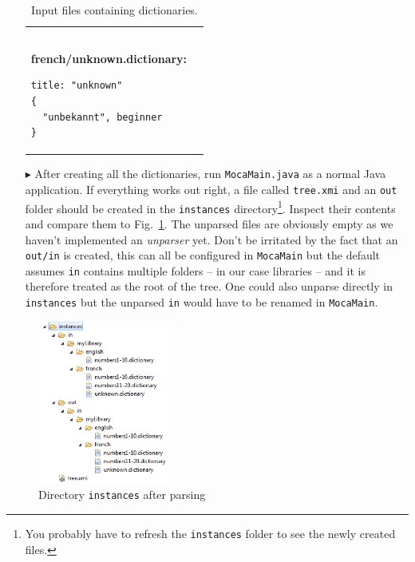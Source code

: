 \begin{enumerate}
\begin{table}
\begin{tabular}{p{6cm} p{6cm} }
\begin{verbatim}
\end{verbatim}
\textbf{french/unknown.dictionary:}
\begin{verbatim}
title: "unknown"
{
  "unbekannt", beginner
}
\end{verbatim}
  \\
\end{tabular}   
\caption{Input files containing dictionaries.}
\label{moca-inputdata}

\end{table}   

\item[$\blacktriangleright$] After creating all the dictionaries, run \texttt{MocaMain.java} as a normal Java application. 
If everything works out right, a file called \texttt{tree.xmi} and an \texttt{out} folder should be created in the \texttt{instances} directory\footnote{You probably have to refresh the \texttt{instances} folder to see the newly created files.}.  
Inspect their contents and compare them to Fig.~\ref{fig:moca-9-ParseResult1}. 
The unparsed files are obviously empty as we haven't implemented an \emph{unparser} yet.  
Don't be irritated by the fact that an \texttt{out/in} is created, this can all be configured in \texttt{MocaMain} but the default assumes \texttt{in} contains multiple folders -- in our case libraries -- and it is therefore treated as the root of the tree.  
One could also unparse directly in \texttt{instances} but the unparsed \texttt{in} would have to be renamed in \texttt{MocaMain}.
\end{enumerate}

\begin{figure}[!htbp]
\begin{center}
 \includegraphics[width=0.4\textwidth]{pics/moca/2TextToMocaTree/9-ParseResult1}
  \caption{Directory \texttt{instances} after parsing}
  \label{fig:moca-9-ParseResult1}
\end{center}
\end{figure} 

